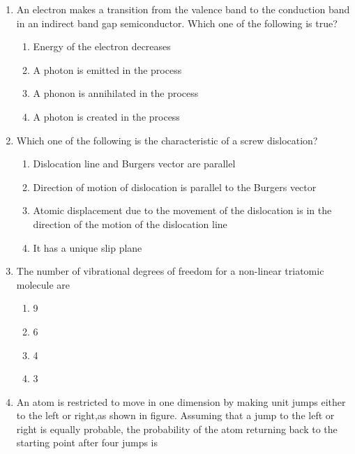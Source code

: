 \documentclass[journal,12pt,onecolumn]{IEEEtran}
\theoremstyle{remark}
\begin{document}
\begin{enumerate}
        \begin{multicols}{2}
    \begin{enumerate}
        \item Ferromagnetic
        \item Diamagnetic
        \item Paramagnetic
        \item Antiferromagnetic
    \end{enumerate}
    \end{multicols}
    \item An electron makes a transition from the valence band to the conduction band in an indirect band gap semiconductor. Which one of the following is true?
    \begin{enumerate}
        \item Energy of the electron decreases
        \item A photon is emitted in the process
        \item A phonon is annihilated in the process
        \item A photon is created in the process
    \end{enumerate}
    \item Which one of the following is the characteristic of a screw dislocation?    
    \begin{enumerate}
        \item Dislocation line and Burgers vector are parallel
        \item Direction of motion of dislocation is parallel to the Burgers vector
        \item Atomic displacement due to the movement of the dislocation is in the direction of the motion of the dislocation line
        \item It has a unique slip plane
    \end{enumerate}
    \item The number of vibrational degrees of freedom for a non-linear triatomic molecule are
        \begin{multicols}{4}
    \begin{enumerate}
        \item 9
        \item 6
        \item 4
        \item 3
    \end{enumerate}
    \end{multicols}
    \item An atom is restricted to move in one dimension by making unit jumps either to the left or right,as shown in figure. Assuming that a jump to the left or right is equally probable, the probability of the atom returning back to the starting point after four jumps is

\end{enumerate}
\end{document}
